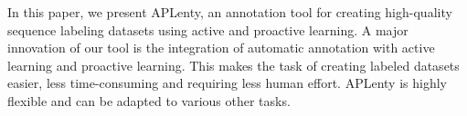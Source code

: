 In this paper, we present APLenty, an annotation tool for creating high-quality sequence labeling datasets using active and proactive learning. A major innovation of our tool is the integration of automatic annotation with active learning and proactive learning. This makes the task of creating labeled datasets easier, less time-consuming and requiring less human effort. APLenty is highly flexible and can be adapted to various other tasks.
